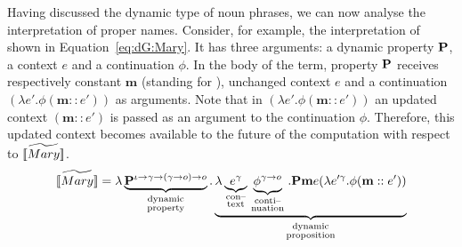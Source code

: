 Having discussed the dynamic type of noun phrases, we can now analyse the interpretation of proper names. 
Consider, for example, the interpretation of  shown in Equation~\eqref{eq:dG:Mary}. It has three arguments: a dynamic property $\P2$, a context $e$ and a continuation $\phi$. In the body of the term, property $\P2$ receives respectively constant $\textbf{m}$ (standing for ), unchanged context $e$ and a continuation $(\lambda e'.\phi (\textbf{m}::{e'}))$ as arguments. Note that in $(\lambda e'.\phi (\textbf{m}::{e'}))$ an updated context $(\textbf{m}::{e'})$ is passed as an argument to the continuation $\phi$. Therefore, this updated context becomes available to the future of the computation with respect to $\widetilde{[\![Mary]\!]}$. 
\begin{align}
\etr{\I{Mary}} =  \lambda \underbrace{{\P2}^{\iota \rightarrow \gamma \rightarrow (\gamma \rightarrow o) \rightarrow o}}_{\begin{smallmatrix}
\text{dynamic}\\
\text{property}
\end{smallmatrix}}. \underbrace{\lambda \underbrace{{e}^{\gamma}}_{\begin{smallmatrix}
\text{con--}\\
\text{text}
\end{smallmatrix}} \underbrace{{\phi}^{\gamma \rightarrow o}}_{\begin{smallmatrix}
\text{conti--}\\
\text{nuation}
\end{smallmatrix}}.\P2 \textbf{m} e (\lambda e'^{\gamma}. \phi ( \upii{\textbf{m}}{e'}))}_{
\begin{smallmatrix}
\text{dynamic}\\
\text{proposition}
\end{smallmatrix}}\label{eq:dG:Mary}
\end{align}

